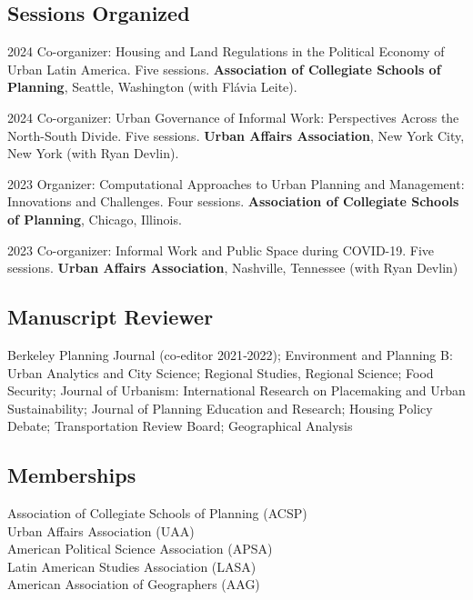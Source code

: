 \documentclass[12pt,letterpaper]{report}
\begin{document}
    \subsection*{Sessions Organized}
    \begin{tablist}
        \item[2024] \tab{}Co-organizer: Housing and Land Regulations in the Political Economy of Urban Latin America. Five sessions. \textbf{Association of Collegiate Schools of Planning}, Seattle, Washington (with Flávia Leite).
        \item[2024] \tab{}Co-organizer: Urban Governance of Informal Work: Perspectives Across the North-South Divide. Five sessions. \textbf{Urban Affairs Association}, New York City, New York (with Ryan Devlin).
        \item[2023] \tab{}Organizer: Computational Approaches to Urban Planning and Management: Innovations and Challenges. Four sessions.  \textbf{Association of Collegiate Schools of Planning}, Chicago, Illinois.
        \item[2023] \tab{}Co-organizer: Informal Work and Public Space during COVID-19. Five sessions. \textbf{Urban Affairs Association}, Nashville, Tennessee (with Ryan Devlin)
    \end{tablist}

    \subsection*{Manuscript Reviewer}
    Berkeley Planning Journal (co‑editor 2021‑2022); Environment and Planning B: Urban Analytics and City Science; Regional Studies, Regional Science; Food Security; Journal of Urbanism: International Research on Placemaking and Urban Sustainability; Journal of Planning Education and Research; Housing Policy Debate; Transportation Review Board; Geographical Analysis

    \subsection*{Memberships}
Association of Collegiate Schools of Planning (ACSP)\\
Urban Affairs Association (UAA)\\
American Political Science Association (APSA)\\
Latin American Studies Association (LASA)\\
American Association of Geographers (AAG) 

    
\end{document}
